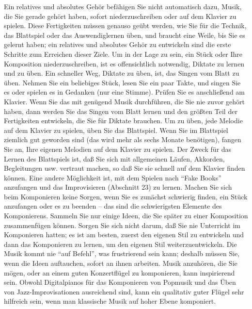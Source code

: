 Ein relatives und absolutes Gehör befähigen Sie nicht automatisch dazu, Musik, die Sie gerade gehört haben, sofort niederzuschreiben oder auf dem Klavier zu spielen.
Diese Fertigkeiten müssen genauso geübt werden, wie Sie für die Technik, das Blattspiel oder das Auswendiglernen üben, und braucht eine Weile, bis Sie es gelernt haben; ein relatives und absolutes Gehör zu entwickeln sind die erste Schritte zum Erreichen dieser Ziele.
Um in der Lage zu sein, ein Stück oder Ihre Komposition niederzuschreiben, ist es offensichtlich notwendig, Diktate zu lernen und zu üben.
Ein schneller Weg, Diktate zu üben, ist, das Singen vom Blatt zu üben.
Nehmen Sie ein beliebiges Stück, lesen Sie ein paar Takte, und singen Sie es oder spielen es in Gedanken (nur eine Stimme).
Prüfen Sie es anschließend am Klavier.
Wenn Sie das mit genügend Musik durchführen, die Sie nie zuvor gehört haben, dann werden Sie das Singen vom Blatt lernen und den größten Teil der Fertigkeiten entwickeln, die Sie für Diktate brauchen.
Um zu üben, jede Melodie auf dem Klavier zu spielen, üben Sie das Blattspiel.
Wenn Sie im Blattspiel ziemlich gut geworden sind (das wird mehr als sechs Monate benötigen), fangen Sie an, Ihre eigenen Melodien auf dem Klavier zu spielen.
Der Zweck für das Lernen des Blattspiels ist, daß Sie sich mit allgemeinen Läufen, Akkorden, Begleitungen usw. vertraut machen, so daß Sie sie schnell auf dem Klavier finden können.
Eine andere Möglichkeit ist, mit dem Spielen nach \enquote{Fake Books} anzufangen und das Improvisieren (Abschnitt 23) zu lernen.
Machen Sie sich beim Komponieren keine Sorgen, wenn Sie es zunächst schwierig finden, ein Stück anzufangen oder es zu beenden -- das sind die schwierigsten Elemente des Komponierens.
Sammeln Sie nur einige Ideen, die Sie später zu einer Komposition zusammenfügen können.
Sorgen Sie sich nicht darum, daß Sie nie Unterricht im Komponieren hatten; es ist am besten, zuerst den eigenen Stil zu entwickeln und dann das Komponieren zu lernen, um den eigenen Stil weiterzuentwickeln.
Die Musik kommt nie \enquote{auf Befehl}, was frustrierend sein kann; deshalb müssen Sie, wenn die Ideen auftauchen, sofort an ihnen arbeiten.
Musik anzuhören, die Sie mögen, oder an einem guten Konzertflügel zu komponieren, kann inspirierend sein.
Obwohl Digitalpianos für das Komponieren von Popmusik und das Üben von Jazz-Improvisationen ausreichend sind, kann ein qualitativ guter Flügel sehr hilfreich sein, wenn man klassische Musik auf hoher Ebene komponiert.



